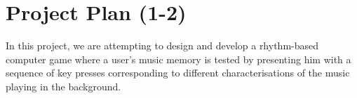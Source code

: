 
\chapter{Project Plan (1-2)} %

\label{Chapter3} %




In this project, we are attempting to design and develop a rhythm-based computer game where a user's music memory is tested  by presenting him with a sequence of key presses corresponding to different characterisations of the music playing in the background.

